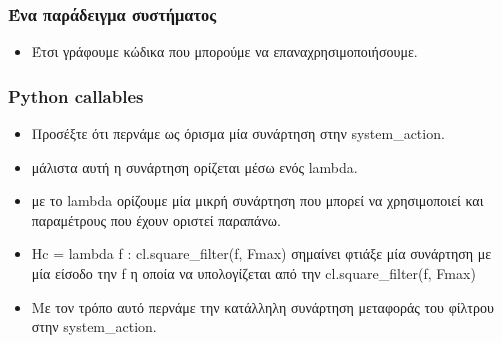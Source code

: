 \documentclass[9pt]{beamer}
\begin{document}
	\begin{frame}
	\frametitle{Ένα παράδειγμα συστήματος}
	\begin{itemize}
		\item Έτσι γράφουμε κώδικα που μπορούμε να επαναχρησιμοποιήσουμε.		
	\end{itemize}
	
	\end{frame}

	\begin{frame}
		\frametitle{Python callables}
		\begin{itemize}
			\item Προσέξτε ότι περνάμε ως όρισμα μία συνάρτηση στην system\_action.
			\item μάλιστα αυτή η συνάρτηση ορίζεται μέσω ενός lambda.
			\item με το lambda ορίζουμε μία μικρή συνάρτηση που μπορεί να χρησιμοποιεί και παραμέτρους που έχουν οριστεί παραπάνω.
			\item Hc = lambda f : cl.square\_filter(f, Fmax) σημαίνει φτιάξε μία συνάρτηση με μία είσοδο την f η οποία να υπολογίζεται από την cl.square\_filter(f, Fmax)
			\item Με τον τρόπο αυτό περνάμε την κατάλληλη συνάρτηση μεταφοράς του φίλτρου στην system\_action.
		\end{itemize}
	\end{frame}
\end{document}
